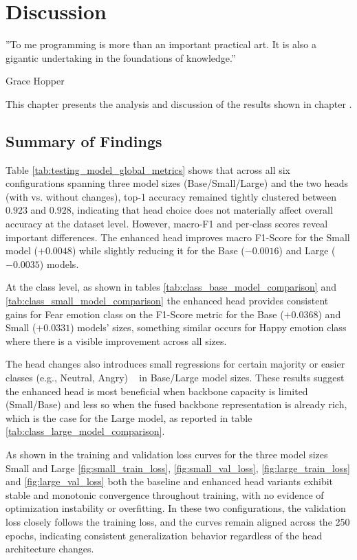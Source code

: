 
\chapter{Discussion}
\epigraph{''To me programming is more than an important practical art. It is also a gigantic undertaking in the foundations of knowledge.''}{\vspace{10pt}Grace Hopper}
\label{chapter:discussion}

\newpage

This chapter presents the analysis and discussion of the results shown in chapter .

\section{Summary of Findings}

Table \ref{tab:testing_model_global_metrics} shows that across all six configurations spanning three model sizes (Base/Small/Large) and the two heads (with vs. without changes), top‑1 accuracy remained tightly clustered between $0.923$ and $0.928$, indicating that head choice does not materially affect overall accuracy at the dataset level. However, macro‑F1 and per‑class scores reveal important differences. The enhanced head improves macro F1-Score for the Small model ($+0.0048$) while slightly reducing it for the Base ($-0.0016$) and Large ($-0.0035$) models. 

At the class level, as shown in tables \ref{tab:class_base_model_comparison} and 
\ref{tab:class_small_model_comparison} the enhanced head provides consistent gains for Fear emotion class on the F1-Score metric for the Base ($+0.0368$) and Small ($+0.0331$) models' sizes, something similar occurs for Happy emotion class where there is a visible improvement across all sizes. 

The head changes also introduces small regressions for certain majority or easier classes (e.g., Neutral, Angry) ~\cite{kollias_affect_2021, zhang_leave_2023, wang_survey_2024} in Base/Large model sizes. These results suggest the enhanced head is most beneficial when backbone capacity is limited (Small/Base)  and less so when the fused backbone representation is already rich, which is the case for the Large model, as reported in table \ref{tab:class_large_model_comparison}.

As shown in the training and validation loss curves for the three model sizes Small and Large  \ref{fig:small_train_loss}, \ref{fig:small_val_loss}, \ref{fig:large_train_loss} and \ref{fig:large_val_loss} both the baseline and enhanced head variants exhibit stable and monotonic convergence throughout training, with no evidence of optimization instability or overfitting. In these two configurations, the validation loss closely follows the training loss, and the curves remain aligned across the 250 epochs, indicating consistent generalization behavior regardless of the head architecture changes. 

